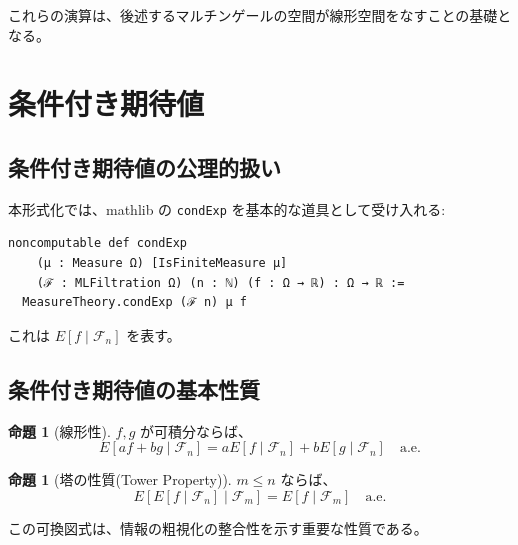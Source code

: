 \documentclass[a4paper,12pt]{ltjsarticle}
\theoremstyle{definition}
\newtheorem{proposition}[definition]{命題}
\begin{document}
これらの演算は、後述するマルチンゲールの空間が線形空間をなすことの基礎となる。

\section{条件付き期待値}

\subsection{条件付き期待値の公理的扱い}

本形式化では、mathlib の \texttt{condExp} を基本的な道具として受け入れる:

\begin{codebox}
\small
\begin{verbatim}
noncomputable def condExp
    (μ : Measure Ω) [IsFiniteMeasure μ]
    (ℱ : MLFiltration Ω) (n : ℕ) (f : Ω → ℝ) : Ω → ℝ :=
  MeasureTheory.condExp (ℱ n) μ f
\end{verbatim}
\end{codebox}

これは $E[f \mid \mathcal{F}_n]$ を表す。

\subsection{条件付き期待値の基本性質}

\begin{proposition}[線形性]
$f, g$ が可積分ならば、
\[
E[af + bg \mid \mathcal{F}_n] = a E[f \mid \mathcal{F}_n] + b E[g \mid \mathcal{F}_n] \quad \text{a.e.}
\]
\end{proposition}

\begin{proposition}[塔の性質(Tower Property)]
$m \leq n$ ならば、
\[
E[E[f \mid \mathcal{F}_n] \mid \mathcal{F}_m] = E[f \mid \mathcal{F}_m] \quad \text{a.e.}
\]
\end{proposition}

\begin{center}
\end{center}

この可換図式は、情報の粗視化の整合性を示す重要な性質である。
\end{document}
